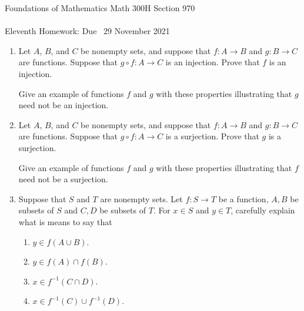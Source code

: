 \documentclass[12pt]{article}
\begin{document}
\LARGE 
\noindent
{\color{Maroon}Foundations of Mathematics \hfill Math 300H Section 970}\vspace{2pt}\\
\Large \vspace{2pt}\\
\large
Eleventh Homework: \hfill Due \  29 November 2021
\normalsize\medskip


\noindent{\color{blue}\rule{528.3675pt}{2pt}}


\begin{enumerate}  %



\item Let $A$, $B$, and $C$ be nonempty sets, and suppose that  $f\colon A\to B$ and $g\colon B\to C$ are functions.
  Suppose that $g\circ f\colon A\to C$ is an injection.
  Prove that $f$ is an injection.

  Give an example of functions $f$ and $g$ with these properties illustrating that $g$ need not be an injection.


\item Let $A$, $B$, and $C$ be nonempty sets, and suppose that  $f\colon A\to B$ and $g\colon B\to C$ are functions.
  Suppose that $g\circ f\colon A\to C$ is a surjection.
  Prove that $g$ is a surjection.

  Give an example of functions $f$ and $g$ with these properties illustrating that $f$ need not be a surjection.


\item Suppose that $S$ and $T$ are nonempty sets.
  Let $f\colon S\to T$ be a function, $A,B$ be subsets of $S$ and $C,D$ be subsets of $T$.
  For $x\in S$ and $y\in T$, carefully explain what is means to say that 
  
 \begin{enumerate}
  \item $y\in f(A\cup B)$.
  \item $y\in f(A)\cap f(B)$.
  \item $x\in f^{-1}(C\cap D)$.
  \item $x\in f^{-1}(C) \cup f^{-1}(D)$.
 \end{enumerate}  



\end{enumerate}
\end{document}
